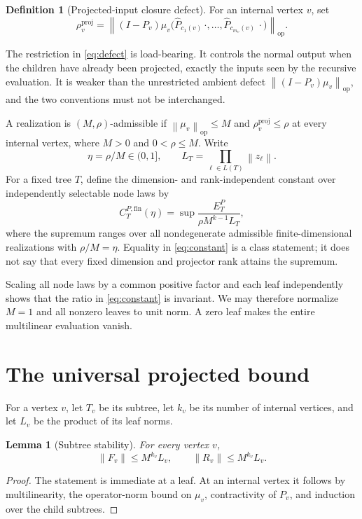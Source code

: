 \documentclass[11pt]{article}
\newtheorem{lemma}[theorem]{Lemma}
\theoremstyle{definition}
\newtheorem{definition}[theorem]{Definition}
\newcommand{\op}{\mathrm{op}}
\newcommand{\fin}{\mathrm{fin}}
\newcommand{\proj}{\mathrm{proj}}
\newcommand{\norm}[1]{\left\lVert #1\right\rVert}
\begin{document}
\begin{definition}[Projected-input closure defect]
For an internal vertex $v$, set
\begin{equation}\label{eq:defect}
 \rho_v^{\proj}=
 \left\|(I-P_v)\mu_v
 \bigl(\widehat P_{c_1(v)}\,\cdot,\ldots,
       \widehat P_{c_{m_v}(v)}\,\cdot\bigr)\right\|_{\op}.
\end{equation}
\end{definition}

The restriction in \eqref{eq:defect} is load-bearing.  It controls the normal
output when the children have already been projected, exactly the inputs seen
by the recursive evaluation.  It is weaker than the unrestricted ambient
defect $\norm{(I-P_v)\mu_v}_{\op}$, and the two conventions must not be
interchanged.

A realization is $(M,\rho)$-admissible if
$\norm{\mu_v}_{\op}\le M$ and $\rho_v^{\proj}\le\rho$ at every internal
vertex, where $M>0$ and $0<\rho\le M$.  Write
\[
 \eta=\rho/M\in(0,1],\qquad
 L_T=\prod_{\ell\in L(T)}\norm{z_\ell}.
\]
For a fixed tree $T$, define the dimension- and rank-independent constant
over independently selectable node laws by
\begin{equation}\label{eq:constant}
 C_T^{P,\fin}(\eta)=
 \sup\frac{E_T^P}{\rho M^{k-1}L_T},
\end{equation}
where the supremum ranges over all nondegenerate admissible
finite-dimensional realizations with $\rho/M=\eta$.  Equality in
\eqref{eq:constant} is a class statement; it does not say that every fixed
dimension and projector rank attains the supremum.

Scaling all node laws by a common positive factor and each leaf independently
shows that the ratio in \eqref{eq:constant} is invariant.  We may therefore
normalize $M=1$ and all nonzero leaves to unit norm.  A zero leaf makes the
entire multilinear evaluation vanish.

\section{The universal projected bound}

For a vertex $v$, let $T_v$ be its subtree, let $k_v$ be its number of
internal vertices, and let $L_v$ be the product of its leaf norms.

\begin{lemma}[Subtree stability]\label{lem:stability}
For every vertex $v$,
\[
 \norm{F_v}\le M^{k_v}L_v,
 \qquad
 \norm{R_v}\le M^{k_v}L_v.
\]
\end{lemma}
\begin{proof}
The statement is immediate at a leaf.  At an internal vertex it follows by
multilinearity, the operator-norm bound on $\mu_v$, contractivity of $P_v$,
and induction over the child subtrees.
\end{proof}
\end{document}
